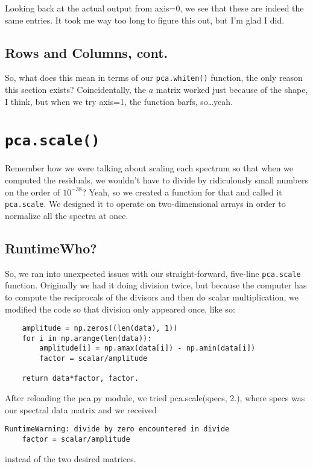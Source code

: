 \documentclass{article}
\begin{document}
Looking back at the actual output from axis=0, we see that these are
indeed the same entries.  It took me way too long to figure this out,
but I'm glad I did.

\subsection{Rows and Columns, cont.}
\label{sec:rowsandcols2}

So, what does this mean in terms of our \verb|pca.whiten()| function,
the only reason this section exists?  Coincidentally, the $a$
matrix worked just because of the shape, I think, but when we try
axis=1, the function barfs, so\ldots yeah.


\section{\texttt{pca.scale()}}
\label{sec:scale}

Remember how we were talking about scaling each spectrum so that when
we computed the residuals, we wouldn't have to divide by ridiculously
small numbers on the order of $10^{-38}$?  Yeah, so we created a
function for that and called it \verb|pca.scale|.  We designed it to
operate on two-dimensional arrays in order to normalize all the
spectra at once.

\subsection{RuntimeWho?}
\label{sec:scalewarning}
So, we ran into unexpected issues with our straight-forward, five-line
\verb|pca.scale| function.  Originally we had it doing division twice,
but because the computer has to compute the reciprocals of the
divisors and then do scalar multiplication, we modified the code so
that division only appeared once, like so:

\begin{verbatim}
    amplitude = np.zeros((len(data), 1))
    for i in np.arange(len(data)):
        amplitude[i] = np.amax(data[i]) - np.amin(data[i])
        factor = scalar/amplitude

    return data*factor, factor.
\end{verbatim}

After reloading the pca.py module, we tried pca.scale(specs, 2.), where
specs was our spectral data matrix and we received
\begin{verbatim}
RuntimeWarning: divide by zero encountered in divide
    factor = scalar/amplitude
\end{verbatim}
instead of the two desired matrices.
\end{document}
